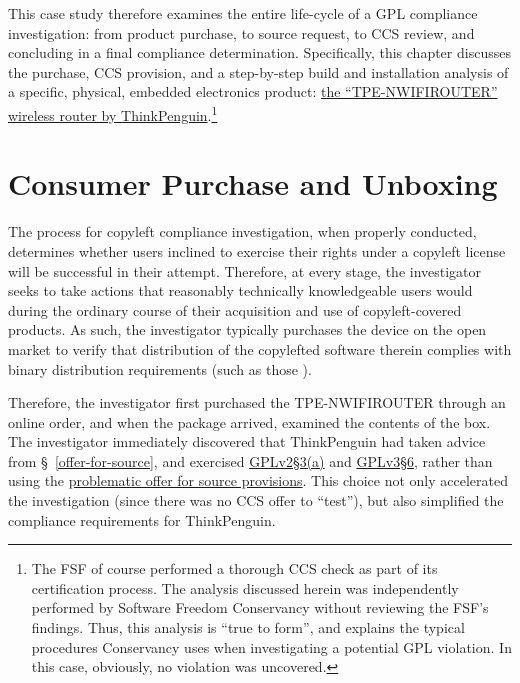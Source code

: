 This case study therefore examines the entire life-cycle of a GPL compliance
investigation: from product purchase, to source request, to CCS review, and concluding
in a final compliance determination.
Specifically, this chapter discusses the purchase, CCS provision, and a
step-by-step build and installation analysis of a specific, physical,
embedded electronics product:
\href{https://www.thinkpenguin.com/gnu-linux/free-software-wireless-n-broadband-router-gnu-linux-tpe-nwifirouter2}{the
  ``TPE-NWIFIROUTER'' wireless router by ThinkPenguin}.\footnote{The FSF of
  course performed a thorough CCS check as part of its certification process.
  The analysis discussed herein was independently performed by Software
  Freedom Conservancy without reviewing the FSF's findings.  Thus, this
  analysis is ``true to form'', and explains the typical procedures Conservancy
  uses when investigating a potential GPL violation.  In this case, obviously, no
  violation was uncovered.}

\section{Consumer Purchase and Unboxing}

The process for copyleft compliance investigation, when properly conducted,
determines whether users inclined to exercise their rights under a copyleft
license will be successful in their attempt.  Therefore, at every stage, the
investigator seeks to take actions that reasonably technically knowledgeable
users would during the ordinary course of their acquisition and use of
copyleft-covered products.  As such, the investigator typically purchases the device on the
open market to verify that distribution of the copylefted software therein
complies with binary distribution requirements (such as those
).


\label{thinkpenguin-included-ccs}

Therefore, the investigator first purchased the TPE-NWIFIROUTER through an
online order, and when the package arrived, examined the contents of the box.
The investigator immediately discovered that ThinkPenguin had taken advice
from \S~\ref{offer-for-source}, and exercised
\hyperref[GPLv2s3a]{GPLv2\S3(a)} and \hyperref[GPLv3s6]{GPLv3\S6}, rather than
using the \hyperref[offer-for-source]{problematic offer for source
  provisions}.  This choice not only accelerated the investigation (since there
was no CCS offer to ``test''), but also simplified the compliance requirements for
ThinkPenguin.

